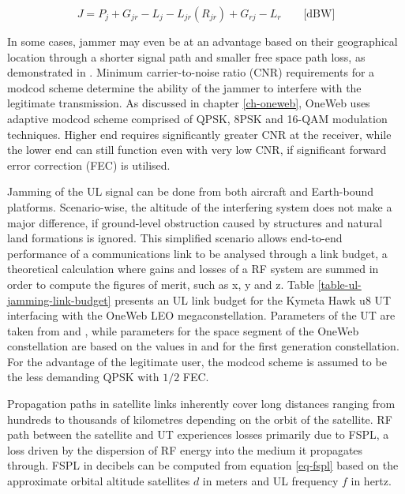 \documentclass[english, 12pt, a4paper, elec, utf8, a-1b, online]{aaltothesis}
\begin{document}
\begin{equation}
  J = P_j + G_{jr}-L_j-L_{jr}(R_{jr})+G_{rj}-L_r \qquad \text{[dBW]}
\end{equation}

In some cases, jammer may even be at an advantage based on their geographical location through a shorter signal path and smaller free space path loss, as demonstrated in \cite{pavur2022defcon}.
Minimum carrier-to-noise ratio (CNR) requirements for a modcod scheme determine the ability of the jammer to interfere with the legitimate transmission.
As discussed in chapter \ref{ch-oneweb}, OneWeb uses adaptive modcod scheme comprised of QPSK, 8PSK and 16-QAM modulation techniques. Higher end requires significantly greater CNR at the receiver, while the lower end can still function even with very low CNR, if significant forward error correction (FEC) is utilised. \cite{allen2022terrestrial,etsi2012en302307}

Jamming of the UL signal can be done from both aircraft and Earth-bound platforms.
Scenario-wise, the altitude of the interfering system does not make a major difference, if ground-level obstruction caused by structures and natural land formations is ignored.
This simplified scenario allows end-to-end performance of a communications link to be analysed through a link budget, a theoretical calculation where gains and losses of a RF system are summed in order to compute the figures of merit, such as x, y and z.%
Table \ref{table-ul-jamming-link-budget} presents an UL link budget for the Kymeta Hawk u8 UT interfacing with the OneWeb LEO megaconstellation.
Parameters of the UT are taken from \cite{kymeta2022hawk} and \cite{kymeta2020mod}, while parameters for the space segment of the OneWeb constellation are based on the values in \cite{worldvu2016loi} and \cite{allen2022terrestrial} for the first generation constellation.
For the advantage of the legitimate user, the modcod scheme is assumed to be the less demanding QPSK with $1/2$ FEC.

Propagation paths in satellite links inherently cover long distances ranging from hundreds to thousands of kilometres depending on the orbit of the satellite.
RF path between the satellite and UT experiences losses primarily due to FSPL, a loss driven by the dispersion of RF energy into the medium it propagates through.
FSPL in decibels can be computed from equation \ref{eq-fspl} based on the approximate orbital altitude satellites $d$ in meters and UL frequency $f$ in hertz.
\end{document}
